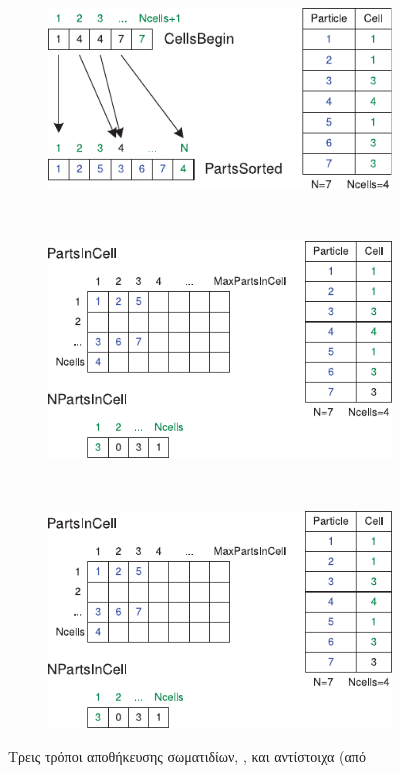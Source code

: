 \begin{figure}[]
  \begin{subfigure}{\textwidth}
    \centering
    \includegraphics[width=.7\textwidth]{figures/sliding-vector.pdf}
  \end{subfigure}\\
  \begin{subfigure}{\textwidth}
    \centering
    \includegraphics[width=.7\textwidth]{figures/static-matrix.pdf}
  \end{subfigure}\\
  \begin{subfigure}{\textwidth}
    \centering
    \includegraphics[width=.7\textwidth]{figures/linked-list.pdf}
  \end{subfigure}
  \caption[Μέθοδοι αποθήκευσης σωματιδίων]{Τρεις τρόποι αποθήκευσης σωματιδίων,
    ,  και  αντίστοιχα (από
     \cite{dominguez2011}}
  \label{fig:particle-storage}
\end{figure}

